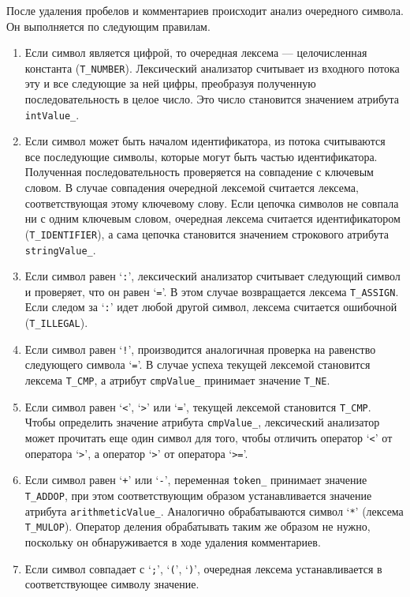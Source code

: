 \documentclass[a4paper,12pt]{article}
\begin{document}
После удаления пробелов и комментариев происходит анализ очередного символа. Он
выполняется по следующим правилам.
\begin{enumerate}
\item Если символ является цифрой, то очередная лексема --- целочисленная константа
(\texttt{T\_NUMBER}). Лексический анализатор считывает из входного потока эту
и все следующие за ней цифры, преобразуя полученную последовательность в целое
число. Это число становится значением атрибута \texttt{intValue\_}.

\item Если символ может быть началом идентификатора, из потока считываются все
последующие символы, которые могут быть частью идентификатора. Полученная
последовательность проверяется на совпадение с ключевым словом. В случае
совпадения очередной лексемой считается лексема, соответствующая этому ключевому
слову. Если цепочка символов не совпала ни с одним ключевым словом, очередная
лексема считается идентификатором (\texttt{T\_IDENTIFIER}), а сама цепочка
становится значением строкового атрибута \texttt{stringValue\_}.

\item Если символ равен `\texttt{:}', лексический анализатор считывает следующий
символ и проверяет, что он равен `\texttt{=}'. В этом случае возвращается
лексема \texttt{T\_ASSIGN}. Если следом за `\texttt{:}' идет любой другой
символ, лексема считается ошибочной (\texttt{T\_ILLEGAL}).

\item Если символ равен `\texttt{!}', производится аналогичная проверка на
равенство следующего символа `\texttt{=}'. В случае успеха текущей лексемой
становится лексема \texttt{T\_CMP}, а атрибут \texttt{cmpValue\_} принимает
значение \texttt{T\_NE}.

\item Если символ равен `\texttt{<}', `\texttt{>}' или `\texttt{=}', текущей
лексемой становится \texttt{T\_CMP}. Чтобы определить значение атрибута
\texttt{cmpValue\_}, лексический анализатор может прочитать еще один символ для
того, чтобы отличить оператор `\texttt{<}' от оператора `\texttt{>}', а оператор
`\texttt{>}' от оператора `\texttt{>=}'. 

\item Если символ равен `\texttt{+}' или `\texttt{-}', переменная
\texttt{token\_} принимает значение \texttt{T\_ADDOP}, при этом соответствующим
образом устанавливается значение атрибута \texttt{arithmeticValue\_}. Аналогично
обрабатываются символ `\texttt{*}' (лексема \texttt{T\_MULOP}). Оператор деления
обрабатывать таким же образом не нужно, поскольку он обнаруживается в ходе
удаления комментариев.

\item Если символ совпадает с `\texttt{;}', `\texttt{(}', `\texttt{)}',
очередная лексема устанавливается в соответствующее символу значение.
\end{enumerate}
\end{document}

